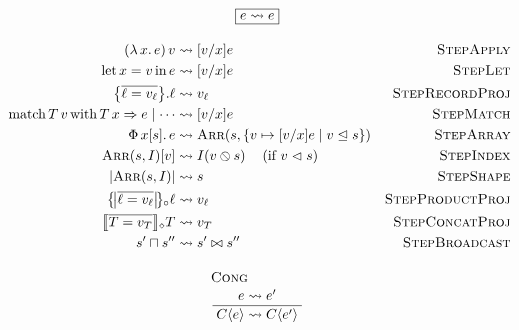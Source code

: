 \begin{align*}
\multispan{3}{\hfil$\displaystyle \boxed{e \step e}$\hfil} \\[1em]
% 
% 
(\slam{x}{e})\,v 
&\leadsto \subst{v}{x}{e} 
& \textsc{StepApply} \\ 
% 
\slet{x}{v}{e} 
&\leadsto \subst{v}{x}{e}
& \textsc{StepLet} \\ 
% 
\sproj{\srecordval{\overline{\ell = v_\ell}}}{\ell} &\leadsto v_\ell 
& \textsc{StepRecordProj} \\
% 
\smatch{\stag{T}{v}}{T\,x\Rightarrow e \mid \cdots} 
&\leadsto \subst{v}{x}{e}
& \textsc{StepMatch} \\
% 
\sbuild{x}{\vess}{e} 
&\leadsto \sarrayval{\vess}{\{ v \mapsto \subst{v}{x}{e} \mid v \inbsp \vess \}} 
& \textsc{StepArray} \\
% 
\sindex{\sarrayval{\vess}{I}}{v} 
&\leadsto I(\scast{v}{s})\;\;\
\text{ (if $v \inbs \vess$)}
& \textsc{StepIndex} \\
% 
\sshape{\sarrayval{\vess}{I}} 
&\leadsto \vess 
& \textsc{StepShape} \\
% 
\sproductproj{\sproductval{\overline{\ell= v_\ell}}}{\ell} 
&\leadsto v_\ell
& \textsc{StepProductProj} \\
% 
\sconcatproj{\sconcatval{\overline{T = v_T}}}{T} 
&\leadsto v_T 
& \textsc{StepConcatProj} \\
% 
\vess' \broadcast \vess'' 
&\leadsto \vess' \broadcastsem \vess'' 
& \textsc{StepBroadcast} 
\\[0.5em]
% 
% 
\multispan{3}{\hfil$\displaystyle \irule{Cong}{e \leadsto e'}{\ctx{\evalct}{e} \leadsto \ctx{\evalct}{e'}}$\hfil}
\end{align*} 
